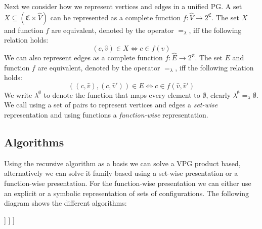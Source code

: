 Next we consider how we represent vertices and edges in a unified PG. A set $X \subseteq (\mathfrak{C} \times \hat{V})$ can be represented as a complete function $f : \hat{V} \rightarrow 2^\mathfrak{C}$. The set $X$ and function $f$ are equivalent, denoted by the operator $=_\lambda$, iff the following relation holds:
\[ (c,\hat{v}) \in X \iff c \in f(\hat{v}) \]
We can also represent edges as a complete function $f : \hat{E} \rightarrow 2^\mathfrak{C}$. The set $E$ and function $f$ are equivalent, denoted by the operator $=_\lambda$, iff the following relation holds:
\[ ((c,\hat{v}),(c,\hat{v}')) \in E \iff c \in f(\hat{v},\hat{v}') \]
We write $\lambda^\emptyset$ to denote the function that maps every element to $\emptyset$, clearly $\lambda^\emptyset =_\lambda \emptyset$. We call using a set of pairs to represent vertices and edges a \textit{set-wise} representation and using functions a \textit{function-wise} representation.

\subsection{Algorithms}
Using the recursive algorithm as a basis we can solve a VPG product based, alternatively we can solve it family based using a set-wise presentation or a function-wise presentation. For the function-wise presentation we can either use an explicit or a symbolic representation of sets of configurations. The following diagram shows the different algorithms:
\begin{center}
	\begin{forest}
		[Recursive algorithm, for tree={parent anchor=south, child anchor=north, align=center, s sep=5mm}
		[Product based]
		[Family based
		[Set-wise]
		[Function-wise
		[Explicit]
		[Symbolic]
		]
		]
		]
	\end{forest}
\end{center}

